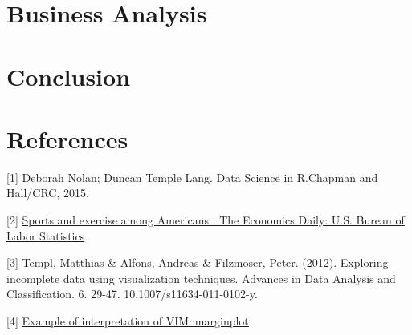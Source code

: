 \documentclass[
]{article}
\begin{document}
\newpage

\hypertarget{business-analysis}{%
\section{Business Analysis}\label{business-analysis}}

\newpage

\hypertarget{conclusion}{%
\section{Conclusion}\label{conclusion}}

\hypertarget{references}{%
\section*{References}\label{references}}

{[}1{]} Deborah Nolan; Duncan Temple Lang. Data Science in R.Chapman and
Hall/CRC, 2015.

{[}2{]}
\href{https://www.bls.gov/opub/ted/2016/sports-and-exercise-among-americans.htm}{Sports
and exercise among Americans : The Economics Daily: U.S. Bureau of Labor
Statistics}

{[}3{]} Templ, Matthias \& Alfons, Andreas \& Filzmoser, Peter. (2012).
Exploring incomplete data using visualization techniques. Advances in
Data Analysis and Classification. 6. 29-47. 10.1007/s11634-011-0102-y.

{[}4{]}
\href{https://boostedml.com/2020/05/visualizing-missing-data-in-r-the-basics-with-vim.html\#The_Margin_Plot_Checking_Missing_Completely_at_Random_MCAR}{Example
of interpretation of VIM::marginplot}
\end{document}
